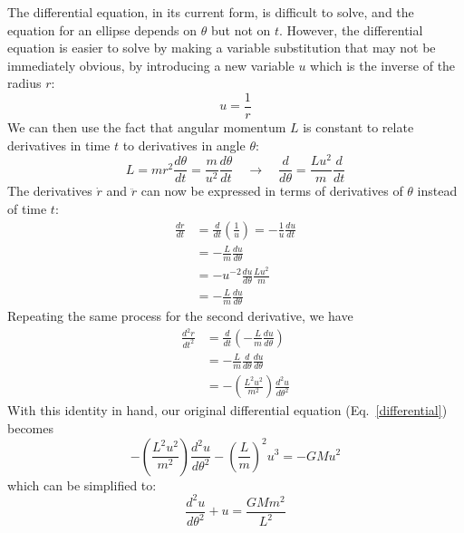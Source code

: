 \documentclass[11pt]{article}
\begin{document}
The differential equation, in its current form, is difficult to solve, and the
equation for an ellipse depends on $\theta$ but not on $t$. However, the
differential equation is easier to solve by making a variable substitution that
may not be immediately obvious, by introducing a new variable $u$ which is
the inverse of the radius $r$:
\begin{equation}
  u=\frac{1}{r}
\end{equation}
We can then use the fact that angular momentum $L$ is constant to relate
derivatives in time $t$ to derivatives in angle $\theta$:
\begin{equation}
  L=mr^2\frac{d\theta}{dt}=\frac{m}{u^2}\frac{d\theta}{dt}
  \quad\longrightarrow\quad
  \frac{d}{d\theta}=\frac{Lu^2}{m}\frac{d}{dt}
\end{equation}
The derivatives $\dot{r}$ and $\ddot{r}$ can now be expressed in terms of
derivatives of $\theta$ instead of time $t$:
\begin{align}
  \frac{dr}{dt} &=\frac{d}{dt}\left(\frac{1}{u}\right)
  =-\frac{1}{u}\frac{du}{dt}\\
  &=-\frac{L}{m}\frac{du}{d\theta}\\
  &= -u^{-2}\frac{du}{d\theta} \frac{Lu^2}{m} \\
  &= -\frac{L}{m}\frac{du}{d\theta}
\end{align}
Repeating the same process for the second derivative, we have
\begin{align}
  \frac{d^2r}{dt^2} &= \frac{d}{dt}\left(-\frac{L}{m}\frac{du}{d\theta}\right)\\
  &= -\frac{L}{m} \frac{d}{d\theta}\frac{du}{d\theta} \\
  &= -\left(\frac{L^2u^2}{m^2}\right)\frac{d^2u}{d\theta^2}
\end{align}
With this identity in hand, our original differential equation
(Eq.\ \ref{differential}) becomes
\begin{equation}
  -\left(\frac{L^2u^2}{m^2}\right)\frac{d^2u}{d\theta^2} - \left(\frac{L}{m}\right)^2u^3 = -GMu^2
\end{equation}
which can be simplified to:
\begin{equation}
  \frac{d^2u}{d\theta^2} + u = \frac{GMm^2}{L^2}
  \label{newdiff}
\end{equation}
\end{document}
